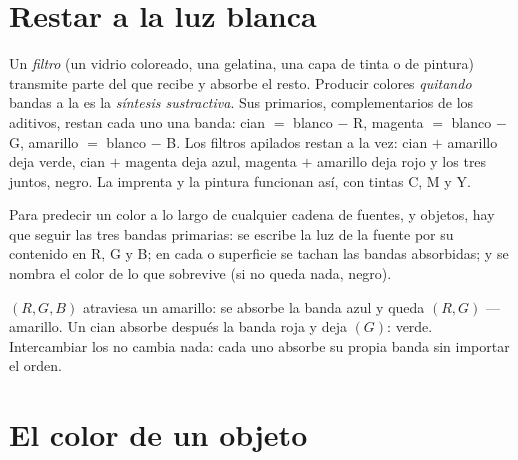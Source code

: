 \section{Restar a la luz blanca}

\begin{definition}\label{def:g11:color-light-sources:subtractive}
Un \emph{filtro} (un vidrio coloreado, una gelatina, una
capa de tinta o de pintura) transmite parte del  que recibe y
absorbe el resto. Producir colores \emph{quitando} bandas a la  es la \emph{síntesis sustractiva}.
Sus primarios, complementarios de los aditivos, restan cada uno una
banda: cian $=$ blanco $-$ R, magenta $=$ blanco $-$ G, amarillo $=$
blanco $-$ B. Los filtros apilados restan a la vez: cian $+$ amarillo
deja verde, cian $+$ magenta deja azul, magenta $+$ amarillo deja rojo y
los tres juntos, negro. La imprenta y la pintura funcionan así, con
tintas C, M y Y.
\end{definition}

\begin{method}\label{met:g11:color-light-sources:bookkeeping}
Para predecir un color a lo largo de cualquier cadena de fuentes,
 y objetos, hay que seguir las tres bandas primarias: se escribe
la luz de la fuente por su contenido en R, G y B; en cada  o
superficie se tachan las bandas absorbidas; y se nombra el color de lo
que sobrevive (si no queda nada, negro).
\end{method}

\begin{example}\label{ex:g11:color-light-sources:chain}
 $(R, G, B)$ atraviesa un  amarillo: se absorbe la banda
azul y queda $(R, G)$ --- amarillo. Un  cian absorbe después la
banda roja y deja $(G)$: verde. Intercambiar los  no cambia nada:
cada uno absorbe su propia banda sin importar el orden.
\end{example}

\section{El color de un objeto}

